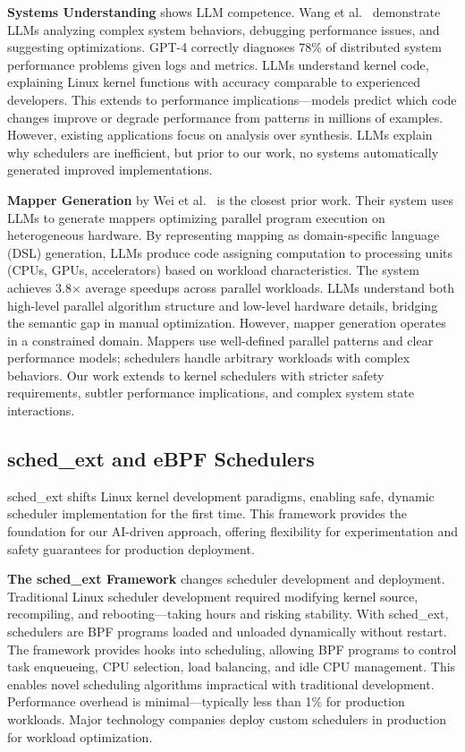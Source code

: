\textbf{Systems Understanding} shows LLM competence. Wang et al.~\cite{wang2024llmsys} demonstrate LLMs analyzing complex system behaviors, debugging performance issues, and suggesting optimizations. GPT-4 correctly diagnoses 78\% of distributed system performance problems given logs and metrics. LLMs understand kernel code, explaining Linux kernel functions with accuracy comparable to experienced developers. This extends to performance implications—models predict which code changes improve or degrade performance from patterns in millions of examples. However, existing applications focus on analysis over synthesis. LLMs explain why schedulers are inefficient, but prior to our work, no systems automatically generated improved implementations.

\textbf{Mapper Generation} by Wei et al.~\cite{wei2024mapper} is the closest prior work. Their system uses LLMs to generate mappers optimizing parallel program execution on heterogeneous hardware. By representing mapping as domain-specific language (DSL) generation, LLMs produce code assigning computation to processing units (CPUs, GPUs, accelerators) based on workload characteristics. The system achieves 3.8× average speedups across parallel workloads. LLMs understand both high-level parallel algorithm structure and low-level hardware details, bridging the semantic gap in manual optimization. However, mapper generation operates in a constrained domain. Mappers use well-defined parallel patterns and clear performance models; schedulers handle arbitrary workloads with complex behaviors. Our work extends to kernel schedulers with stricter safety requirements, subtler performance implications, and complex system state interactions.

\subsection{sched\_ext and eBPF Schedulers}

sched\_ext shifts Linux kernel development paradigms, enabling safe, dynamic scheduler implementation for the first time. This framework provides the foundation for our AI-driven approach, offering flexibility for experimentation and safety guarantees for production deployment.

\textbf{The sched\_ext Framework} changes scheduler development and deployment. Traditional Linux scheduler development required modifying kernel source, recompiling, and rebooting—taking hours and risking stability. With sched\_ext, schedulers are BPF programs loaded and unloaded dynamically without restart. The framework provides hooks into scheduling, allowing BPF programs to control task enqueueing, CPU selection, load balancing, and idle CPU management. This enables novel scheduling algorithms impractical with traditional development. Performance overhead is minimal—typically less than 1\% for production workloads. Major technology companies deploy custom schedulers in production for workload optimization.

